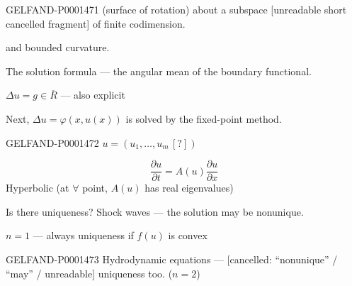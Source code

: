 \begin{GelfandAdjacentEvidence}{GELFAND-P000147}{1}
(surface of rotation) about a subspace [unreadable short cancelled fragment] of finite codimension.
\end{GelfandAdjacentEvidence}

and bounded curvature.

The solution formula — the angular mean of the boundary functional.

$\Delta u=g\in\overline R$ — also explicit

Next, $\Delta u=\varphi (x, u (x))$ is solved by the fixed-point method.


\begin{GelfandAdjacentEvidence}{GELFAND-P000147}{2}
$u=(u_1,\ldots, u_m\, [?])$
\end{GelfandAdjacentEvidence}

\begin{equation*}
\frac{\partial u}{\partial t}=A (u)\frac{\partial u}{\partial x}
\end{equation*}
Hyperbolic (at $\forall$ point, $A (u)$ has real eigenvalues)

Is there uniqueness? Shock waves — the solution may be nonunique.

$n=1$ — always uniqueness if $f (u)$ is convex

\begin{GelfandAdjacentEvidence}{GELFAND-P000147}{3}
Hydrodynamic equations — [cancelled: “nonunique” / “may” / unreadable] uniqueness too. ($n=2$)
\end{GelfandAdjacentEvidence}

